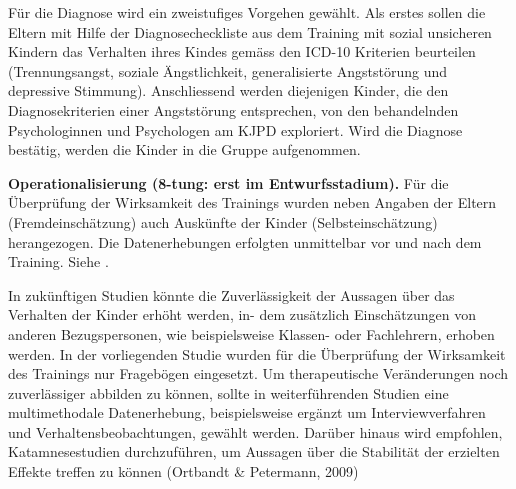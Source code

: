 Für die Diagnose wird ein zweistufiges Vorgehen gewählt. Als erstes sollen die Eltern mit Hilfe der Diagnosecheckliste aus dem Training mit sozial unsicheren Kindern \cite{Petermann:2015} das Verhalten ihres Kindes gemäss den ICD-10 Kriterien beurteilen (Trennungsangst, soziale Ängstlichkeit, generalisierte Angststörung und depressive Stimmung). Anschliessend werden diejenigen Kinder, die den Diagnosekriterien einer Angststörung entsprechen, von den behandelnden Psychologinnen und Psychologen am KJPD exploriert. Wird die Diagnose bestätig, werden die Kinder in die Gruppe aufgenommen.




\textbf{Operationalisierung (8-tung: erst im Entwurfsstadium).} Für die Überprüfung der Wirksamkeit des Trainings wurden neben Angaben der Eltern (Fremdeinschätzung) auch Auskünfte der Kinder (Selbsteinschätzung) herangezogen. Die Datenerhebungen erfolgten unmittelbar vor und nach dem Training. 
Siehe .


In zukünftigen Studien könnte die Zuverlässigkeit der Aussagen über das Verhalten der Kinder erhöht werden, in- dem zusätzlich Einschätzungen von anderen Bezugspersonen, wie beispielsweise Klassen- oder Fachlehrern, erhoben werden. In der vorliegenden Studie wurden für die Überprüfung der Wirksamkeit des Trainings nur Fragebögen eingesetzt. Um therapeutische Veränderungen noch zuverlässiger abbilden zu können, sollte in weiterführenden Studien eine multimethodale Datenerhebung, beispielsweise ergänzt um Interviewverfahren und Verhaltensbeobachtungen, gewählt werden. Darüber hinaus wird empfohlen, Katamnesestudien durchzuführen, um Aussagen über die Stabilität der erzielten Effekte treffen zu können (Ortbandt \& Petermann, 2009)